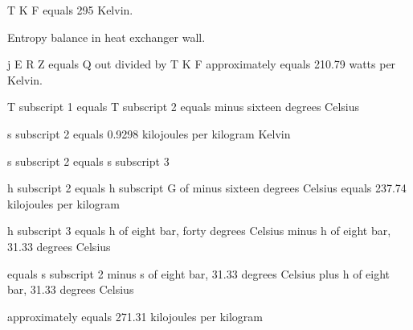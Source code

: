 T K F equals 295 Kelvin.

Entropy balance in heat exchanger wall.

j E R Z equals Q out divided by T K F approximately equals 210.79 watts per Kelvin.

T subscript 1 equals T subscript 2 equals minus sixteen degrees Celsius

s subscript 2 equals 0.9298 kilojoules per kilogram Kelvin

s subscript 2 equals s subscript 3

h subscript 2 equals h subscript G of minus sixteen degrees Celsius equals 237.74 kilojoules per kilogram

h subscript 3 equals h of eight bar, forty degrees Celsius minus h of eight bar, 31.33 degrees Celsius

equals s subscript 2 minus s of eight bar, 31.33 degrees Celsius plus h of eight bar, 31.33 degrees Celsius

approximately equals 271.31 kilojoules per kilogram